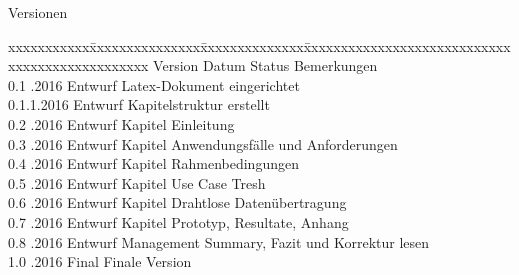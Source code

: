 
\null
\vfill

\begin{Large}
Versionen
\end{Large}

\fontsize{10pt}{18pt}\selectfont
\begin{tabbing}
xxxxxxxxxxx\=xxxxxxxxxxxxxxx\=xxxxxxxxxxxxxx\=xxxxxxxxxxxxxxxxxxxxxxxxxxxxxxxxxxxxxxxxxxxxxxx \kill
Version	\> Datum	\> Status		\> Bemerkungen		\\
0.1	.2016	\> Entwurf		\> Latex-Dokument eingerichtet	\\
0.1.1.2016	\> Entwurf		\> Kapitelstruktur erstellt \\
0.2	.2016	\> Entwurf		\> Kapitel Einleitung \\
0.3	.2016	\> Entwurf		\> Kapitel Anwendungsfälle und Anforderungen \\
0.4	.2016	\> Entwurf		\> Kapitel Rahmenbedingungen \\
0.5	.2016	\> Entwurf		\> Kapitel Use Case Tresh \\
0.6	.2016	\> Entwurf		\> Kapitel Drahtlose Datenübertragung \\
0.7	.2016	\> Entwurf		\> Kapitel Prototyp, Resultate, Anhang \\
0.8	.2016	\> Entwurf		\> Management Summary, Fazit und Korrektur lesen \\
1.0	.2016	\> Final		\> Finale Version \\
\end{tabbing}
